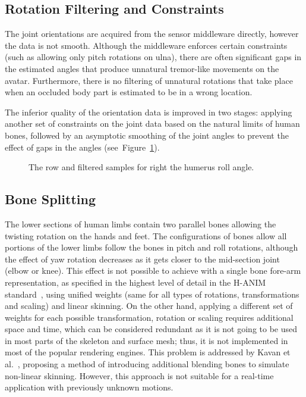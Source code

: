 \subsection{Rotation Filtering and Constraints}
The joint orientations are acquired from the sensor middleware directly, however the data is not smooth. Although the middleware enforces certain constraints (such as allowing only pitch rotations on ulna), there are often significant gaps in the estimated angles that produce unnatural tremor-like movements on the avatar. Furthermore, there is no filtering of unnatural rotations that take place when an occluded body part is estimated to be in a wrong location. 

The inferior quality of the orientation data is improved in two stages: applying another set of constraints on the joint data based on the natural limits of human bones, followed by an asymptotic smoothing of the joint angles to prevent the effect of gaps in the angles (see~Figure~\ref{fig:rotation-filter}). 

\begin{figure}[htbp]
	\centerline{ 
	}
\caption{The row and filtered samples for right the humerus roll angle.}
	\label{fig:rotation-filter}
\end{figure}


\subsection {Bone Splitting}
\label{subsection_bone_splitting}
The lower sections of human limbs contain two parallel bones allowing the twisting rotation on the hands and feet. The configurations of bones allow all portions of the lower limbs follow the bones in pitch and roll rotations, although the effect of yaw rotation decreases as it gets closer to the mid-section joint (elbow or knee). This effect is not possible to achieve with a single bone fore-arm representation, as specified in the highest level of detail in the H-ANIM standard~\cite{HANIM}, using unified weights (same for all types of rotations, transformations and scaling) and linear skinning. On the other hand, applying a different set of weights for each possible  transformation, rotation or scaling requires additional space and time, which can be considered redundant as it is not going to be used in most parts of the skeleton and surface mesh; thus, it is not implemented in most of the popular rendering engines. This problem is addressed by Kavan et al.~\cite{Kavan2009}, proposing a method of introducing additional blending bones to simulate non-linear skinning. However, this approach is not suitable for a real-time application with previously unknown motions. 

